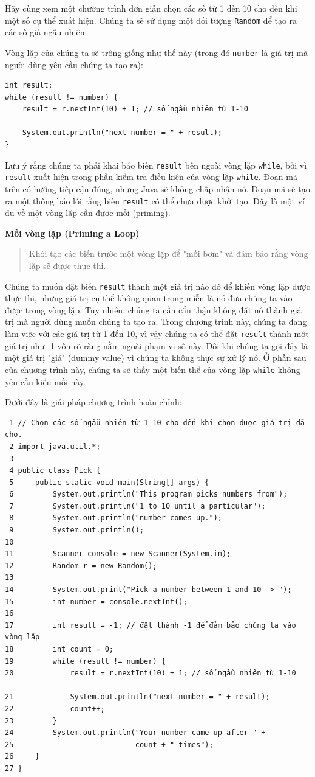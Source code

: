 Hãy cùng xem một chương trình đơn giản chọn các số từ 1 đến 10 cho đến khi một số cụ thể xuất hiện. Chúng ta sẽ sử dụng một đối tượng \texttt{Random} để tạo ra các số giả ngẫu nhiên.

Vòng lặp của chúng ta sẽ trông giống như thế này (trong đó \texttt{number} là giá trị mà người dùng yêu cầu chúng ta tạo ra):
\begin{verbatim}
int result;
while (result != number) {
    result = r.nextInt(10) + 1; // số ngẫu nhiên từ 1-10

    System.out.println("next number = " + result);
}
\end{verbatim}

Lưu ý rằng chúng ta phải khai báo biến \texttt{result} bên ngoài vòng lặp \texttt{while}, bởi vì \texttt{result} xuất hiện trong phần kiểm tra điều kiện của vòng lặp \texttt{while}. Đoạn mã trên có hướng tiếp cận đúng, nhưng Java sẽ không chấp nhận nó. Đoạn mã sẽ tạo ra một thông báo lỗi rằng biến \texttt{result} có thể chưa được khởi tạo. Đây là một ví dụ về một vòng lặp cần được mồi (priming).

\textbf{Mồi vòng lặp (Priming a Loop)}
\begin{quote}
Khởi tạo các biến trước một vòng lặp để "mồi bơm" và đảm bảo rằng vòng lặp sẽ được thực thi.
\end{quote}

Chúng ta muốn đặt biến \texttt{result} thành một giá trị nào đó để khiến vòng lặp được thực thi, nhưng giá trị cụ thể không quan trọng miễn là nó đưa chúng ta vào được trong vòng lặp. Tuy nhiên, chúng ta cần cẩn thận không đặt nó thành giá trị mà người dùng muốn chúng ta tạo ra. Trong chương trình này, chúng ta đang làm việc với các giá trị từ 1 đến 10, vì vậy chúng ta có thể đặt \texttt{result} thành một giá trị như -1 vốn rõ ràng nằm ngoài phạm vi số này. Đôi khi chúng ta gọi đây là một giá trị "giả" (dummy value) vì chúng ta không thực sự xử lý nó. Ở phần sau của chương trình này, chúng ta sẽ thấy một biến thể của vòng lặp \texttt{while} không yêu cầu kiểu mồi này.

Dưới đây là giải pháp chương trình hoàn chỉnh:
\begin{verbatim}
 1 // Chọn các số ngẫu nhiên từ 1-10 cho đến khi chọn được giá trị đã cho.
 2 import java.util.*;
 3 
 4 public class Pick {
 5     public static void main(String[] args) {
 6         System.out.println("This program picks numbers from");
 7         System.out.println("1 to 10 until a particular");
 8         System.out.println("number comes up.");
 9         System.out.println();
10
11         Scanner console = new Scanner(System.in);
12         Random r = new Random();
13
14         System.out.print("Pick a number between 1 and 10--> ");
15         int number = console.nextInt();
16
17         int result = -1; // đặt thành -1 để đảm bảo chúng ta vào vòng lặp
18         int count = 0;
19         while (result != number) {
20             result = r.nextInt(10) + 1; // số ngẫu nhiên từ 1-10

21             System.out.println("next number = " + result);
22             count++;
23         }
24         System.out.println("Your number came up after " +
25                            count + " times");
26     }
27 }
\end{verbatim}

